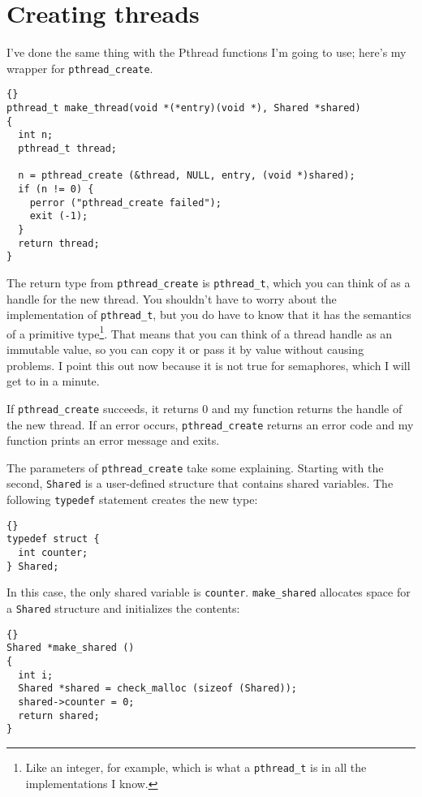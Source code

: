 \documentclass{book}
\begin{document}
\section{Creating threads}

I've done the same thing with the Pthread functions I'm going to use;
here's my wrapper for {\tt pthread\_create}.

\begin{lstlisting}[title={}]{}
pthread_t make_thread(void *(*entry)(void *), Shared *shared)
{
  int n;
  pthread_t thread;

  n = pthread_create (&thread, NULL, entry, (void *)shared);
  if (n != 0) {
    perror ("pthread_create failed");
    exit (-1);
  }
  return thread;
}
\end{lstlisting}

The return type from {\tt pthread\_create} is {\tt pthread\_t},
which you can think of as a handle for the new thread.  You
shouldn't have to worry about the implementation of {\tt pthread\_t},
but you do have to know that it has the semantics of a primitive
type\footnote{Like an integer, for example, which is what a
{\tt pthread\_t} is in all the implementations I know.}.  That
means that you can think of a thread handle as an immutable
value, so you can copy it or pass it by value without causing
problems.  I point this out now because it is not true for
semaphores, which I will get to in a minute.

If {\tt pthread\_create} succeeds, it returns 0 and my function
returns the handle of the new thread.
If an error occurs, {\tt pthread\_create} 
returns an error code and my function prints an error message
and exits.

The parameters of {\tt pthread\_create} take some
explaining.  Starting with the second,
{\tt Shared}
is a user-defined structure that contains shared variables.
The following {\tt typedef} statement creates the new type:

\begin{lstlisting}[title={}]{}
typedef struct {
  int counter;
} Shared;
\end{lstlisting}

In this case, the only shared variable is {\tt counter}.
{\tt make\_shared} allocates
space for a {\tt Shared} structure and initializes the contents:

\begin{lstlisting}[title={}]{}
Shared *make_shared ()
{
  int i;
  Shared *shared = check_malloc (sizeof (Shared));
  shared->counter = 0;
  return shared;
}
\end{lstlisting}
\end{document}
